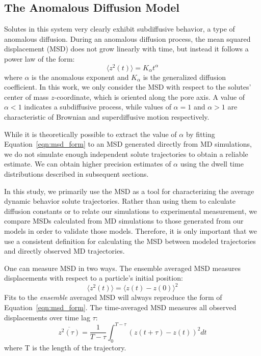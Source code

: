 \documentclass[aps,pre,preprint,groupedaddress]{revtex4-2}
\begin{document}
  \subsection{The Anomalous Diffusion Model}\label{method:model_sFBM}

  Solutes in this system very clearly exhibit subdiffusive behavior, a type of
  anomalous diffusion. During an anomalous diffusion process, the mean squared 
  displacement (MSD) does not grow linearly with time, but instead it follows 
  a power law of the form: 
  \begin{equation} 
  \langle z^2(t) \rangle = K_{\alpha}t^{\alpha}
  \label{eqn:msd_form}
  \end{equation} 
  where $\alpha$ is the anomalous exponent and $K_{\alpha}$ is the generalized 
  diffusion coefficient. In this work, we only consider the MSD with respect to
  the solutes' center of mass $z$-coordinate, which is oriented along the pore 
  axis. A value of $\alpha < 1$ indicates a subdiffusive process, while values
  of $\alpha = 1$ and $\alpha > 1$ are characteristic of Brownian and 
  superdiffusive motion respectively.

  While it is theoretically possible to extract the value of $\alpha$ by fitting
  Equation~\ref{eqn:msd_form} to an MSD generated directly from MD simulations, 
  we do not simulate enough independent solute trajectories to obtain a reliable
  estimate. We can obtain higher precision estimates of $\alpha$ using the dwell
  time distributions described in subsequent sections.
  

  In this study, we primarily use the MSD as a tool for characterizing
  the average dynamic behavior solute trajectories. Rather than using
  them to calculate diffusion constants or to relate our simulations
  to experimental measurement, we compare MSDs calculated from MD
  simulations to those generated from our models in order to validate
  those models. Therefore, it is only important that we use a
  consistent definition for calculating the MSD between modeled
  trajectories and directly observed MD trajectories.

  One can measure MSD in two ways. The ensemble averaged MSD measures 
  displacements with respect to a particle's initial position:
  \begin{equation}
  \langle z^2(t) \rangle = \langle z(t) - z(0) \rangle^2
  \label{eqn:ensemble_msd}
  \end{equation}
  Fits to the \textit{ensemble} averaged MSD will always reproduce the form of 
  Equation~\ref{eqn:msd_form}. The time-averaged MSD measures all observed 
  displacements over time lag $\tau$: 
  \begin{equation}
  \overline{z^2(\tau)} = \dfrac{1}{T - \tau}\int_{0}^{T - \tau} (z(t + \tau) - z(t))^2 dt
  \label{eqn:tamsd}
  \end{equation}
  where T is the length of the trajectory. 
  
\end{document}

